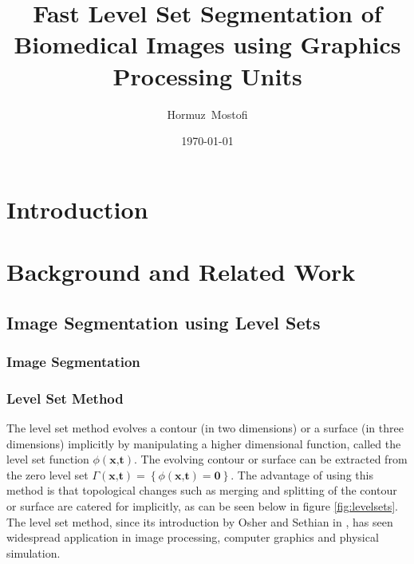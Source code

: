 \documentclass{report}
\begin{document}
\title{Fast Level Set Segmentation of Biomedical Images using Graphics Processing Units}
\author{Hormuz~Mostofi}
\date{\today}
\maketitle

\tableofcontents

\chapter{Introduction}

\chapter{Background and Related Work}
	\section{Image Segmentation using Level Sets}
	
\subsection{Image Segmentation}
\subsection{Level Set Method}
The level set method evolves a contour (in two dimensions) or a surface (in three dimensions) implicitly by manipulating a higher dimensional function, called the level set function $\phi(\textbf{x,t})$. The evolving contour or surface can be extracted from the zero level set $\Gamma(\textbf{x,t})=\left\{\phi(\textbf{x,t}) = \textbf{0}\right\}$. The advantage of using this method is that topological changes such as merging and splitting of the contour or surface are catered for implicitly, as can be seen below in figure \ref{fig:levelsets}. The level set method, since its introduction by Osher and Sethian in \cite{oshersethian}, has seen widespread application in image processing, computer graphics and physical simulation.
\end{document}
